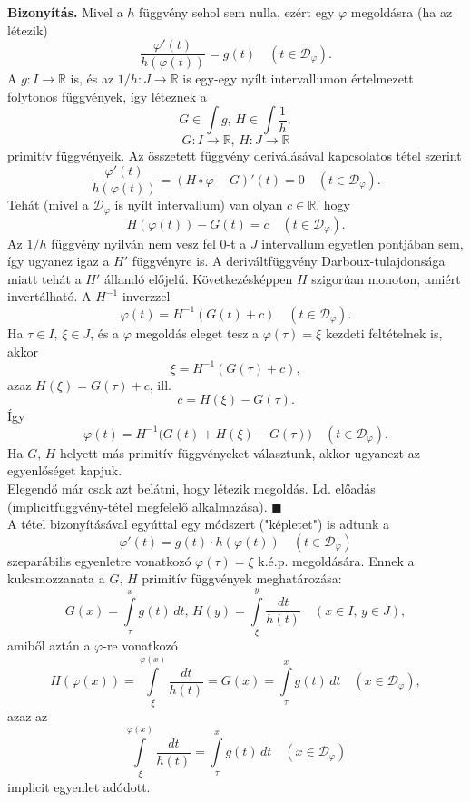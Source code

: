 \documentclass{article}
\newcommand{\R}{\mathbb{R}}
\newcommand{\Dp}{\mathcal{D}_\varphi}
\begin{document}
	\textbf{Bizonyítás.} Mivel a $h$ függvény sehol sem nulla, ezért egy $\varphi$ megoldásra (ha az létezik)
	\[
		\frac{\varphi'(t)}{h(\varphi(t))} = g(t) \quad (t \in \Dp).
	\]
	A $g : I \to \R$ is, és az $1 / h : J \to \R$ is egy-egy nyílt intervallumon értelmezett folytonos függvények, így léteznek a
	\[
		G \in \int g, \, H \in \int \frac{1}{h},
	\]
	\[
		G : I \to \R, \, H : J \to \R
	\]
	primitív függvényeik. Az összetett függvény deriválásával kapcsolatos tétel szerint
	\[
		\frac{\varphi'(t)}{h(\varphi(t))} = (H \circ \varphi - G)'(t) = 0 \quad (t \in \Dp).
	\]
	Tehát (mivel a $\Dp$ is nyílt intervallum) van olyan $c \in \R$, hogy
	\[
		H(\varphi(t)) - G(t) = c \quad (t \in \Dp).
	\]
	Az $1/h$ függvény nyilván nem vesz fel 0-t a $J$ intervallum egyetlen pontjában sem, így ugyanez igaz a $H'$ függvényre is. A deriváltfüggvény Darboux-tulajdonsága miatt tehát a $H'$ állandó előjelű. Következésképpen $H$ szigorúan monoton, amiért invertálható. A $H^{-1}$ inverzzel
	\[
		\varphi(t) = H^{-1}(G(t) + c) \quad (t \in \Dp).
	\]
	Ha $\tau \in I, \, \xi \in J$, és a $\varphi$ megoldás eleget tesz a $\varphi(\tau) = \xi$ kezdeti feltételnek is, akkor
	\[
		\xi = H^{-1}(G(\tau) + c),
	\]
	azaz $H(\xi) = G(\tau) + c$, ill.
	\[
		c = H(\xi) - G(\tau).
	\]
	Így
	\[
		\varphi(t) = H^{-1}\big( G(t) + H(\xi) - G(\tau) \big) \quad (t \in \Dp).
	\]
	Ha $G, \, H$ helyett más primitív függvényeket választunk, akkor ugyanezt az egyenlőséget kapjuk.\\
	
	Elegendő már csak azt belátni, hogy létezik megoldás. Ld. előadás (implicitfüggvény-tétel megfelelő alkalmazása). $\blacksquare$\\
	
	A tétel bizonyításával egyúttal egy módszert ("képletet") is adtunk a
	\[
		\varphi'(t) = g(t) \cdot h(\varphi(t)) \quad (t \in \Dp)
	\]
	szeparábilis egyenletre vonatkozó $\varphi(\tau) = \xi$ k.é.p. megoldására. Ennek a kulcsmozzanata a $G, \, H$ primitív függvények meghatározása:
	\[
		G(x) = \int\limits_\tau^x g(t) \, dt, \, H(y) = \int\limits_\xi^y \frac{dt}{h(t)} \quad (x \in I, \, y \in J),
	\]
	amiből aztán a $\varphi$-re vonatkozó
	\[
		H(\varphi(x)) = \int\limits_\xi^{\varphi(x)} \frac{dt}{h(t)} = G(x) = \int\limits_\tau^x g(t) \, dt \quad (x \in \Dp),
	\]
	azaz az
	\[
		\int\limits_\xi^{\varphi(x)} \frac{dt}{h(t)} = \int\limits_\tau^x g(t) \, dt \quad (x \in \Dp)
	\]
	implicit egyenlet adódott.
	
	
	
	
\end{document}
